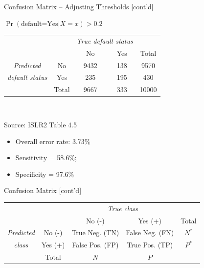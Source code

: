 \documentclass[ignorenonframetext,xcolor=x11names]{beamer}
\begin{document}
\begin{frame}{Confusion Matrix -- Adjusting Thresholds \small [cont'd]}
\begin{block}{}
\begin{center}
\renewcommand{\arraystretch}{1.25}

$\Pr(\text{default=Yes} | X=x) > 0.2$ \\ \vspace{2mm}
\begin{tabular}{cc|cc|c} \hline
     & & \multicolumn{2}{c|}{\emph{True default status}} \\
     & & No & Yes & Total \\ \hline
\emph{Predicted} & No & 9432 & 138 & 9570 \\ 
\emph{default status} & Yes & 235 & 195 & 430 \\ \hline
     & Total & 9667 & 333 & 10000 \\ \hline
\end{tabular} \\
\end{center}

\scriptsize Source: ISLR2 Table 4.5
\end{block}

\begin{itemize}
  \item Overall error rate: 3.73\% 
  \item Sensitivity = 58.6\%;
  \item Specificity = 97.6\%
\end{itemize}
\end{frame}

\begin{frame}{Confusion Matrix \small [cont'd]}
\begin{block}{}
\small
\begin{center}
\renewcommand{\arraystretch}{1.25}

\begin{tabular}{cc|cc|c} \hline
     & & \multicolumn{2}{c|}{\emph{True class}} \\
     & & No (-) & Yes (+) & Total \\ \hline
\emph{Predicted} & No (-) & True Neg. (TN) & False Neg. (FN) & $N^*$ \\ 
\emph{class} & Yes (+) & False Pos. (FP) & True Pos. (TP) & $P^*$ \\ \hline
     & Total & $N$ & $P$ &  \\ \hline
\end{tabular} \\
\end{center}
\end{block}
\end{frame}
\end{document}
